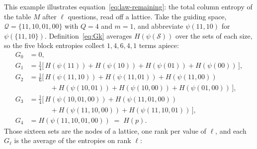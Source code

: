 \documentclass[11pt]{article}
\begin{document}
\begin{example}
This example illustrates equation~\eqref{eq:law-remaining}: the
total column entropy of the table $M$ after $\ell$ questions, read
off a lattice. Take the guiding space, $\mathcal Q = \{11, 10, 01,
00\}$ with $Q = 4$ and $m = 1$, and abbreviate $\psi(11, 10)$ for
$\psi(\{11, 10\})$. Definition~\eqref{eq:Gk} averages
$H(\psi(\mathcal S))$ over the sets of each size, so the five block
entropies collect $1, 4, 6, 4, 1$ terms apiece:
\begin{align*}
  G_0 &= 0, \\
  G_1 &= \tfrac{1}{4}\big[\,
    H(\psi(11)) + H(\psi(10)) + H(\psi(01)) + H(\psi(00))
    \,\big], \\
  G_2 &= \tfrac{1}{6}\big[\,
    H(\psi(11,10)) + H(\psi(11,01)) + H(\psi(11,00)) \\[-2pt]
  &\qquad\quad {}+ H(\psi(10,01)) + H(\psi(10,00))
    + H(\psi(01,00)) \,\big], \\
  G_3 &= \tfrac{1}{4}\big[\,
    H(\psi(10,01,00)) + H(\psi(11,01,00)) \\[-2pt]
  &\qquad\quad {}+ H(\psi(11,10,00)) + H(\psi(11,10,01)) \,\big], \\
  G_4 &= H(\psi(11,10,01,00)) \;=\; H(p).
\end{align*}
Those sixteen sets are the nodes of a lattice, one rank per value of
$\ell$, and each $G_\ell$ is the average of the entropies on rank
$\ell$:
%
\begin{center}
\end{center}
\end{example}
\end{document}
